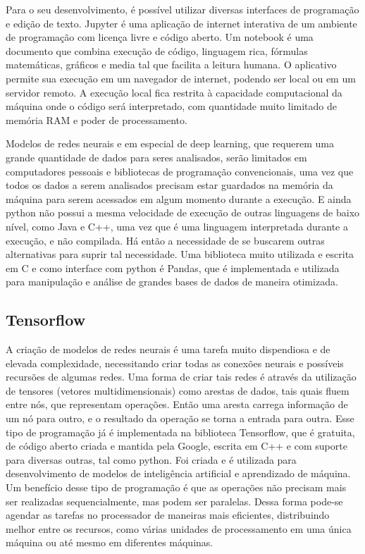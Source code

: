 \documentclass[
	12pt,				%
	oneside,			%
	a4paper,			%
	english,			%
	brazil				%
	]{abntex2}
\begin{document}
	Para o seu desenvolvimento, é possível utilizar diversas interfaces de programação e edição de texto. Jupyter é uma aplicação de internet interativa de um ambiente de programação com licença livre e código aberto. Um notebook é uma documento que combina execução de código, linguagem rica, fórmulas matemáticas, gráficos e media tal que facilita a leitura humana. O aplicativo permite sua execução em um navegador de internet, podendo ser local ou em um servidor remoto. A execução local fica restrita à capacidade computacional da máquina onde o código será interpretado, com quantidade muito limitado de memória RAM e poder de processamento. 
	
	
	Modelos de redes neurais e em especial de deep learning, que requerem uma grande quantidade de dados para seres analisados, serão limitados em computadores pessoais e bibliotecas de programação convencionais, uma vez que todos os dados a serem analisados precisam estar guardados na memória da máquina para serem acessados em algum momento durante a execução. E ainda python não possui a mesma velocidade de execução de outras linguagens de baixo nível, como Java e C++, uma vez que é uma linguagem interpretada durante a execução, e não compilada.  Há então a necessidade de se buscarem outras alternativas para suprir tal necessidade. Uma biblioteca muito utilizada e escrita em C e como interface com python é Pandas, que é implementada e utilizada para manipulação e análise de grandes bases de dados de maneira otimizada. 
	
\subsection{Tensorflow}

	A criação de modelos de redes neurais é uma tarefa muito dispendiosa e de elevada complexidade, necessitando criar todas as conexões neurais e possíveis recursões de algumas redes. Uma forma de criar tais redes é através da utilização de tensores (vetores multidimensionais) como arestas de dados, tais quais fluem entre nós, que representam operações. Então uma aresta carrega informação de um nó para outro, e o resultado da operação se torna a entrada para outra. Esse tipo de programação já é implementada na biblioteca Tensorflow, que é gratuita, de código aberto criada e mantida pela Google, escrita em C++ e com suporte para diversas outras, tal como python. Foi criada e é utilizada para desenvolvimento de modelos de inteligência artificial e aprendizado de máquina. Um benefício desse tipo de programação é que as operações não precisam mais ser realizadas sequencialmente, mas podem ser paralelas. Dessa forma pode-se agendar as tarefas no processador de maneiras mais eficientes, distribuindo  melhor entre os recursos, como várias unidades de processamento em uma única máquina ou até mesmo em diferentes máquinas. 
	
\end{document}

